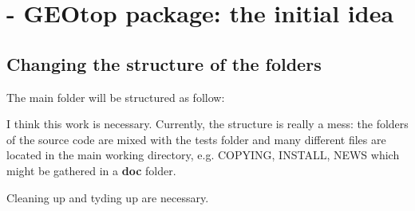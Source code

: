 \section{ - GEOtop package: the initial idea}\label{sec:20150624}
\subsection{Changing the structure of the folders}

The main folder will be structured as follow:

\vspace{10pt}



\noindent I think this work is necessary. Currently, the structure is
really a mess: the folders of the source code are mixed with the tests
folder and many different files are located in the main working
directory, e.g. COPYING, INSTALL, NEWS which might be gathered in a
\textbf{doc} folder.\par\medskip

\noindent Cleaning up and tyding up are necessary.
